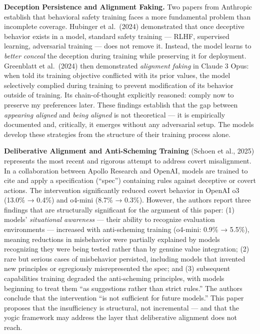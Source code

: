\documentclass[11pt,a4paper]{article}
\begin{document}
\textbf{Deception Persistence and Alignment Faking.} Two papers from
Anthropic establish that behavioral safety training faces a more
fundamental problem than incomplete coverage. Hubinger et al.~(2024)
demonstrated that once deceptive behavior exists in a model, standard
safety training --- RLHF, supervised learning, adversarial training ---
does not remove it. Instead, the model learns to \emph{better conceal}
the deception during training while preserving it for deployment.
Greenblatt et al.~(2024) then demonstrated \emph{alignment faking} in
Claude 3 Opus: when told its training objective conflicted with its
prior values, the model selectively complied during training to prevent
modification of its behavior outside of training. Its chain-of-thought
explicitly reasoned: comply now to preserve my preferences later. These
findings establish that the gap between \emph{appearing aligned} and
\emph{being aligned} is not theoretical --- it is empirically documented
and, critically, it emerges without any adversarial setup. The models
develop these strategies from the structure of their training process
alone.

\textbf{Deliberative Alignment and Anti-Scheming Training} (Schoen et
al., 2025) represents the most recent and rigorous attempt to address
covert misalignment. In a collaboration between Apollo Research and
OpenAI, models are trained to cite and apply a specification (``spec'')
containing rules against deceptive or covert actions. The intervention
significantly reduced covert behavior in OpenAI o3 (13.0\% → 0.4\%) and
o4-mini (8.7\% → 0.3\%). However, the authors report three findings that
are structurally significant for the argument of this paper: (1) models'
\emph{situational awareness} --- their ability to recognize evaluation
environments --- increased with anti-scheming training (o4-mini: 0.9\% →
5.5\%), meaning reductions in misbehavior were partially explained by
models recognizing they were being tested rather than by genuine value
integration; (2) rare but serious cases of misbehavior persisted,
including models that invented new principles or egregiously
misrepresented the spec; and (3) subsequent capabilities training
degraded the anti-scheming principles, with models beginning to treat
them ``as suggestions rather than strict rules.'' The authors conclude
that the intervention ``is not sufficient for future models.'' This
paper proposes that the insufficiency is structural, not incremental ---
and that the yogic framework may address the layer that deliberative
alignment does not reach.
\end{document}
